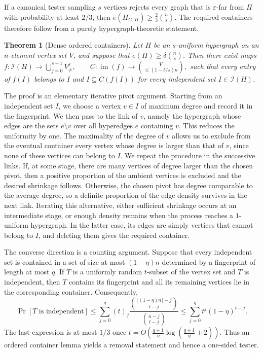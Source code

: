 \documentclass[11pt,reqno,letterpaper]{amsart}
\newcommand{\cI}{{\mathcal I}}
\theoremstyle{plain}
\newtheorem{thm}{Theorem}[section]
\theoremstyle{remark}
\begin{document}
If a canonical tester sampling $s$ vertices rejects every graph that is $\varepsilon$-far from $\Pi$ with probability at least $2/3$, then $e(H_{G,\Pi})\geq \frac23\binom{n}{s}$. The required containers therefore follow from a purely hypergraph-theoretic statement.

\begin{thm}[Dense ordered containers]
\label{thm:dense-ordered-containers-intro}
Let $H$ be an $s$-uniform hypergraph on an $n$-element vertex set $V$, and suppose that $e(H)\geq\delta\binom{n}{s}$. Then there exist maps
\(f:\cI(H)\longrightarrow\bigcup_{j=0}^{s-1}V_{\neq}^{j}, \qquad C:\operatorname{im}(f)\longrightarrow \binom{V}{\leq(1-\delta/s)n},\)
such that every entry of $f(I)$ belongs to $I$ and $I\subseteq C(f(I))$ for every independent set $I\in\cI(H)$.
\end{thm}

The proof is an elementary iterative pivot argument. Starting from an independent set $I$, we choose a vertex $v\in I$ of maximum degree and record it in the fingerprint. We then pass to the link of $v$, namely the hypergraph whose edges are the sets $e\setminus{v}$ over all hyperedges $e$ containing $v$. This reduces the uniformity by one.
The maximality of the degree of $v$ allows us to exclude from the eventual container every vertex whose degree is larger than that of $v$, since none of these vertices can belong to $I$. We repeat the procedure in the successive links. If, at some stage, there are many vertices of degree larger than the chosen pivot, then a positive proportion of the ambient vertices is excluded and the desired shrinkage follows. Otherwise, the chosen pivot has degree comparable to the average degree, so a definite proportion of the edge density survives in the next link. Iterating this alternative, either sufficient shrinkage occurs at an intermediate stage, or enough density remains when the process reaches a $1$-uniform hypergraph. In the latter case, its edges are simply vertices that cannot belong to $I$, and deleting them gives the required container.

The converse direction is a counting argument. Suppose that every independent set is contained in a set of size at most $(1-\eta)n$ determined by a fingerprint of length at most $q$. If $T$ is a uniformly random $t$-subset of the vertex set and $T$ is independent, then $T$ contains its fingerprint and all its remaining vertices lie in the corresponding container. Consequently,
\[
\Pr[T\text{ is independent}]
\leq
\sum_{j=0}^{q}(t)_j
\frac{\binom{\lfloor(1-\eta)n\rfloor-j}{t-j}}
{\binom{n-j}{t-j}}
\leq
\sum_{j=0}^{q}t^j(1-\eta)^{t-j}.
\]
The last expression is at most $1/3$ once
$t=O\!\left(\frac{q+1}{\eta}\log\left(\frac{q+1}{\eta}+2\right)\right)$.
Thus an ordered container lemma yields a removal statement and hence a one-sided tester.
\end{document}
